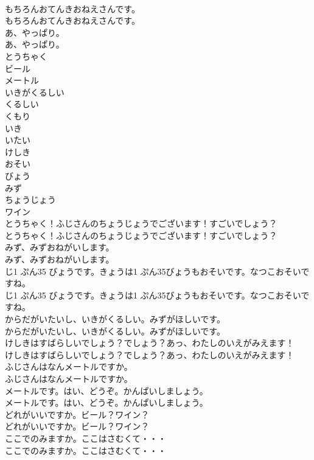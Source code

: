 \documentclass[8pt]{extreport}
\begin{document}
\begin{CJK}{UTF8}{min}
\\	もちろんおてんきおねえさんです。	
\\	もちろんおてんきおねえさんです。 
\\	あ、やっぱり。	
\\	あ、やっぱり。 
\\	とうちゃく
\\	ビール
\\	メートル
\\	いきがくるしい
\\	くるしい
\\	くもり
\\	いき
\\	いたい
\\	けしき
\\	おそい
\\	びょう
\\	みず
\\	ちょうじょう
\\	ワイン
\\	とうちゃく！ふじさんのちょうじょうでございます！すごいでしょう？	
\\	とうちゃく！ふじさんのちょうじょうでございます！すごいでしょう？ 
\\	みず、みずおねがいします。	
\\	みず、みずおねがいします。 
\\	じ1 ぷん35 びょうです。きょうは1 ぷん35びょうもおそいです。なつこおそいですね。	
\\	じ1 ぷん35 びょうです。きょうは1 ぷん35びょうもおそいです。なつこおそいですね。 
\\	からだがいたいし、いきがくるしい。みずがほしいです。	
\\	からだがいたいし、いきがくるしい。みずがほしいです。 
\\	けしきはすばらしいでしょう？でしょう？あっ、わたしのいえがみえます！	
\\	けしきはすばらしいでしょう？でしょう？あっ、わたしのいえがみえます！ 
\\	ふじさんはなんメートルですか。	
\\	ふじさんはなんメートルですか。 
\\	メートルです。はい、どうぞ。かんぱいしましょう。	
\\	メートルです。はい、どうぞ。かんぱいしましょう。 
\\	どれがいいですか。ビール？ワイン？	
\\	どれがいいですか。ビール？ワイン？ 
\\	ここでのみますか。ここはさむくて・・・	
\\	ここでのみますか。ここはさむくて・・・ 

\end{CJK}
\end{document}

